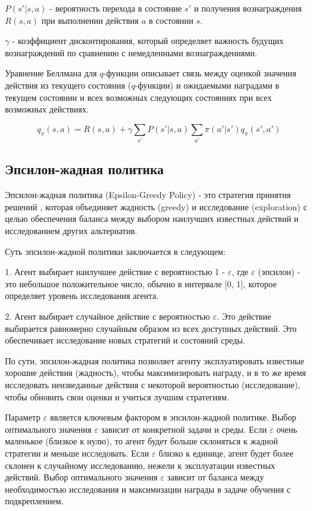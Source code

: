 $P(s'|s, a)$ - вероятность перехода в состояние $s'$ и получения вознаграждения $R(s,a)$ при выполнении действия $a$ в состоянии $s$.

$\gamma$ - коэффициент дисконтирования, который определяет важность будущих вознаграждений по сравнению с немедленными вознаграждениями.


Уравнение Беллмана для $q$-функции описывает связь между оценкой значения действия из текущего состояния ($q$-функции) и ожидаемыми наградами в текущем состоянии и всех возможных следующих состояниях при всех возможных действиях.

$$q_{\pi}(s, a) = R(s, a) + \gamma \sum_{s'}P(s'|s, a)\sum_{a'}\pi(a'|s')q_{\pi}(s', a')$$


\subsection{Эпсилон-жадная политика}

Эпсилон-жадная политика (Epsilon-Greedy Policy) - это стратегия принятия решений , которая объединяет жадность (greedy) и исследование (exploration) с целью обеспечения баланса между выбором наилучших известных действий и исследованием других альтернатив.

Суть эпсилон-жадной политики заключается в следующем:

1. Агент выбирает наилучшее действие с вероятностью 1 - $\varepsilon$, где $\varepsilon$ (эпсилон) - это небольшое положительное число, обычно в интервале [0, 1], которое определяет уровень исследования агента.

2. Агент выбирает случайное действие с вероятностью $\varepsilon$. Это действие выбирается равномерно случайным образом из всех доступных действий. Это обеспечивает исследование новых стратегий и состояний среды.

По сути, эпсилон-жадная политика позволяет агенту эксплуатировать известные хорошие действия (жадность), чтобы максимизировать награду, и в то же время исследовать неизведанные действия с некоторой вероятностью (исследование), чтобы обновить свои оценки и учиться лучшим стратегиям.

Параметр $\varepsilon$ является ключевым фактором в эпсилон-жадной политике. Выбор оптимального значения $\varepsilon$ зависит от конкретной задачи и среды. Если $\varepsilon$ очень маленькое (близкое к нулю), то агент будет больше склоняться к жадной стратегии и меньше исследовать. Если $\varepsilon$ близко к единице, агент будет более склонен к случайному исследованию, нежели к эксплуатации известных действий. Выбор оптимального значения $\varepsilon$ зависит от баланса между необходимостью исследования и максимизации награды в задаче обучения с подкреплением.

